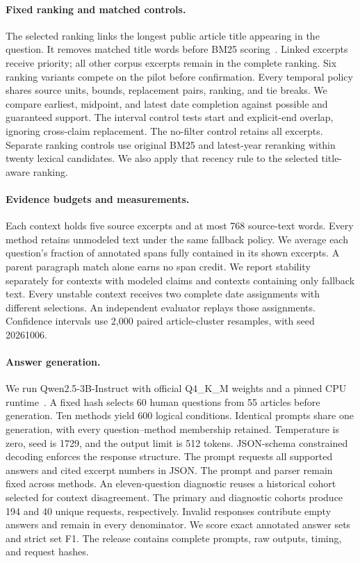 \paragraph{Fixed ranking and matched controls.}
The selected ranking links the longest public article title appearing in the question.
It removes matched title words before BM25 scoring~\citep{robertson1995bm25}.
Linked excerpts receive priority; all other corpus excerpts remain in the complete ranking.
Six ranking variants compete on the pilot before confirmation.
Every temporal policy shares source units, bounds, replacement pairs, ranking, and tie breaks.
We compare earliest, midpoint, and latest date completion against possible and guaranteed support.
The interval control tests start and explicit-end overlap, ignoring cross-claim replacement.
The no-filter control retains all excerpts.
Separate ranking controls use original BM25 and latest-year reranking within twenty lexical candidates.
We also apply that recency rule to the selected title-aware ranking.

\paragraph{Evidence budgets and measurements.}
Each context holds five source excerpts and at most 768 source-text words.
Every method retains unmodeled text under the same fallback policy.
We average each question's fraction of annotated spans fully contained in its shown excerpts.
A parent paragraph match alone earns no span credit.
We report stability separately for contexts with modeled claims and contexts containing only fallback text.
Every unstable context receives two complete date assignments with different selections.
An independent evaluator replays those assignments.
Confidence intervals use 2,000 paired article-cluster resamples, with seed 20261006.

\paragraph{Answer generation.}
We run Qwen2.5-3B-Instruct with official Q4\_K\_M weights and a pinned CPU runtime~\citep{qwen2024model}.
A fixed hash selects 60 human questions from 55 articles before generation.
Ten methods yield 600 logical conditions.
Identical prompts share one generation, with every question--method membership retained.
Temperature is zero, seed is 1729, and the output limit is 512 tokens.
JSON-schema constrained decoding enforces the response structure.
The prompt requests all supported answers and cited excerpt numbers in JSON.
The prompt and parser remain fixed across methods.
An eleven-question diagnostic reuses a historical cohort selected for context disagreement.
The primary and diagnostic cohorts produce 194 and 40 unique requests, respectively.
Invalid responses contribute empty answers and remain in every denominator.
We score exact annotated answer sets and strict set F1.
The release contains complete prompts, raw outputs, timing, and request hashes.
